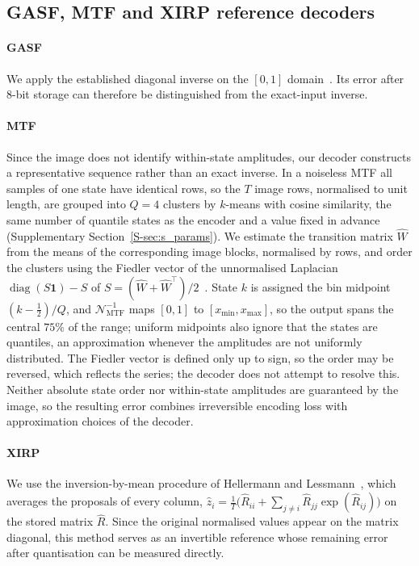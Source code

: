 \documentclass[preprint,review,12pt]{elsarticle}
\begin{document}
\subsection{GASF, MTF and XIRP reference decoders}

\paragraph{GASF} We apply the established diagonal inverse on the $[0,1]$ domain~\cite{wang2015encoding}. Its error after 8-bit storage can therefore be distinguished from the exact-input inverse.

\paragraph{MTF} Since the image does not identify within-state amplitudes, our decoder constructs a representative sequence rather than an exact inverse. In a noiseless MTF all samples of one state have identical rows, so the $T$ image rows, normalised to unit length, are grouped into $Q=4$ clusters by $k$-means with cosine similarity, the same number of quantile states as the encoder and a value fixed in advance (Supplementary Section~\ref{S-sec:s_params}). We estimate the transition matrix $\hat W$ from the means of the corresponding image blocks, normalised by rows, and order the clusters using the Fiedler vector of the unnormalised Laplacian $\operatorname{diag}(S\mathbf1)-S$ of $S=(\hat W+\hat W^\top)/2$~\cite{Atkins1998}. State $k$ is assigned the bin midpoint $(k-\tfrac12)/Q$, and $\mathcal N^{-1}_{\mathrm{MTF}}$ maps $[0,1]$ to $[x_{\min},x_{\max}]$, so the output spans the central $75\%$ of the range; uniform midpoints also ignore that the states are quantiles, an approximation whenever the amplitudes are not uniformly distributed. The Fiedler vector is defined only up to sign, so the order may be reversed, which reflects the series; the decoder does not attempt to resolve this. Neither absolute state order nor within-state amplitudes are guaranteed by the image, so the resulting error combines irreversible encoding loss with approximation choices of the decoder.

\paragraph{XIRP} We use the inversion-by-mean procedure of Hellermann and Lessmann~\cite{hellermann2026imagegan}, which averages the proposals of every column, $\hat z_i=\frac1T\bigl(\hat R_{ii}+\sum_{j\ne i}\hat R_{jj}\exp(\hat R_{ij})\bigr)$ on the stored matrix $\hat R$. Since the original normalised values appear on the matrix diagonal, this method serves as an invertible reference whose remaining error after quantisation can be measured directly.
\end{document}

